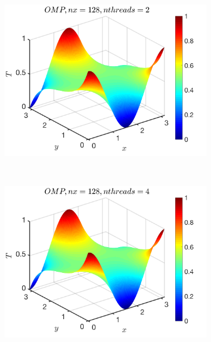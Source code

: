 \documentclass[a4paper]{article}
\begin{document}
          \begin{figure}[H]
        \centering
        \begin{subfigure}[b]{0.32\textwidth}   
            \centering 
            \includegraphics[width=\textwidth]{./Figure/heat_omp_nx128_nth2.png} 
        \end{subfigure}
        \
        \begin{subfigure}[b]{0.32\textwidth}   
            \centering 
            \includegraphics[width=\textwidth]{./Figure/heat_omp_nx128_nth4.png}  
        \end{subfigure}
        \
                \begin{subfigure}[b]{0.32\textwidth}   
            \centering 

\end{subfigure}
\end{figure}
\end{document}
